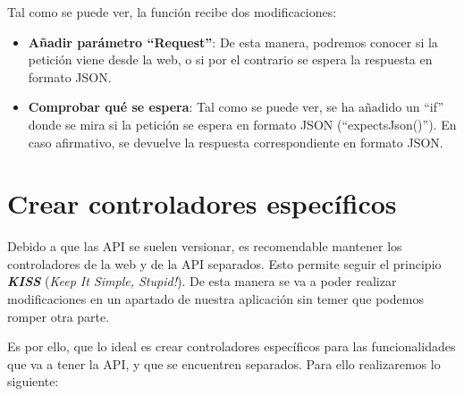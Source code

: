 Tal como se puede ver, la función recibe dos modificaciones:

\begin{itemize}
    \item \textbf{Añadir parámetro “Request”}: De esta manera, podremos conocer si la petición viene desde la web, o si por el contrario se espera la respuesta en formato JSON.

    \item \textbf{Comprobar qué se espera}: Tal como se puede ver, se ha añadido un “if” donde se mira si la petición se espera en formato JSON (“expectsJson()”). En caso afirmativo, se devuelve la respuesta correspondiente en formato JSON.
\end{itemize}




\section{Crear controladores específicos}

Debido a que las API se suelen versionar, es recomendable mantener los controladores de la web y de la API separados. Esto permite seguir el principio \textbf{\textit{KISS}} (\textit{Keep It Simple, Stupid!}). De esta manera se va a poder realizar modificaciones en un apartado de nuestra aplicación sin temer que podemos romper otra parte.

Es por ello, que lo ideal es crear controladores específicos para las funcionalidades que va a tener la API, y que se encuentren separados. Para ello realizaremos lo siguiente:


